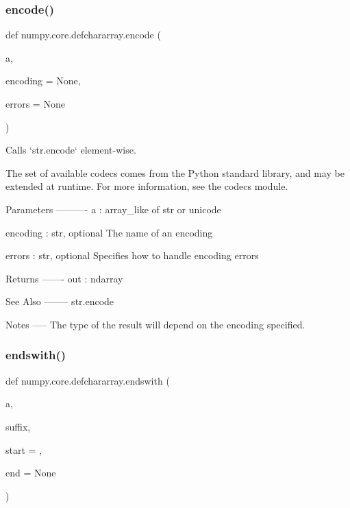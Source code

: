 \subsubsection{\texorpdfstring{encode()}{encode()}}
{\footnotesize\ttfamily def numpy.\+core.\+defchararray.\+encode (\begin{DoxyParamCaption}\item[{}]{a,  }\item[{}]{encoding = {\ttfamily None},  }\item[{}]{errors = {\ttfamily None} }\end{DoxyParamCaption})}

\begin{DoxyVerb}Calls `str.encode` element-wise.

The set of available codecs comes from the Python standard library,
and may be extended at runtime. For more information, see the codecs
module.

Parameters
----------
a : array_like of str or unicode

encoding : str, optional
   The name of an encoding

errors : str, optional
   Specifies how to handle encoding errors

Returns
-------
out : ndarray

See Also
--------
str.encode

Notes
-----
The type of the result will depend on the encoding specified.\end{DoxyVerb}
 \mbox{\label{namespacenumpy_1_1core_1_1defchararray_a071d58de4b1d43aac3665aff0b4bb7f7}} 
\subsubsection{\texorpdfstring{endswith()}{endswith()}}
{\footnotesize\ttfamily def numpy.\+core.\+defchararray.\+endswith (\begin{DoxyParamCaption}\item[{}]{a,  }\item[{}]{suffix,  }\item[{}]{start = {},  }\item[{}]{end = {\ttfamily None} }\end{DoxyParamCaption})}

